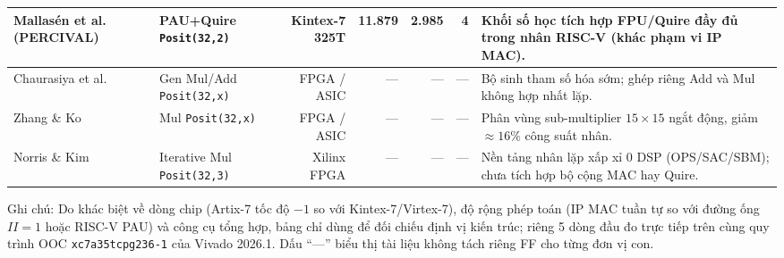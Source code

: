 \begin{table}[!htbp]
\begin{tabularx}{\textwidth}{@{}>{\raggedright\arraybackslash}p{29mm} >{\raggedright\arraybackslash}p{24mm} r r r r Y@{}}
    Mallasén et al. (PERCIVAL)~\cite{mallasen2022percival} & PAU+Quire \texttt{Posit(32,2)} & Kintex-7 325T & 11.879 & 2.985 & 4 & Khối số học tích hợp FPU/Quire đầy đủ trong nhân RISC-V (khác phạm vi IP MAC). \\
    \midrule
    Chaurasiya et al.~\cite{chaurasiya2018parameterized} & Gen Mul/Add \texttt{Posit(32,x)} & FPGA / ASIC & --- & --- & --- & Bộ sinh tham số hóa sớm; ghép riêng Add và Mul không hợp nhất lặp. \\
    Zhang \& Ko~\cite{zhang2020positmul} & Mul \texttt{Posit(32,x)} & FPGA / ASIC & --- & --- & --- & Phân vùng sub-multiplier $15{\times}15$ ngắt động, giảm $\approx 16\%$ công suất nhân. \\
    Norris \& Kim~\cite{norris2021iterativeposit} & Iterative Mul \texttt{Posit(32,3)} & Xilinx FPGA & --- & --- & --- & Nền tảng nhân lặp xấp xỉ 0 DSP (OPS/SAC/SBM); chưa tích hợp bộ cộng MAC hay Quire. \\
    \bottomrule
  \end{tabularx}
  \vspace{2pt}
  {\footnotesize Ghi chú: Do khác biệt về dòng chip (Artix-7 tốc độ $-1$ so với Kintex-7/Virtex-7), độ rộng phép toán (IP MAC tuần tự so với đường ống $II=1$ hoặc RISC-V PAU) và công cụ tổng hợp, bảng chỉ dùng để đối chiếu định vị kiến trúc; riêng 5 dòng đầu đo trực tiếp trên cùng quy trình OOC \texttt{xc7a35tcpg236-1} của Vivado 2026.1. Dấu ``---'' biểu thị tài liệu không tách riêng FF cho từng đơn vị con.}
\end{table}
